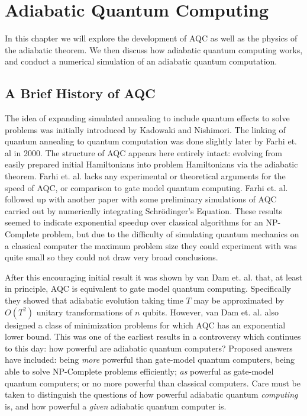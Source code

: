 \chapter{Adiabatic Quantum Computing}
\label{chap:aqc}

In this chapter we will explore the development of AQC as well as the physics of the adiabatic theorem.  We then discuss how adiabatic quantum computing works, and conduct a numerical simulation of an adiabatic quantum computation.

\section{A Brief History of AQC}
The idea of expanding simulated annealing to include quantum effects to solve problems was initially introduced by Kadowaki and Nishimori.\cite{transverse}  The linking of quantum annealing to quantum computation was done slightly later by Farhi et. al in 2000.\cite{farhi}  The structure of AQC appears here entirely intact: evolving from easily prepared initial Hamiltonians into problem Hamiltonians via the adiabatic theorem.  Farhi et. al.\cite{farhi} lacks any experimental or theoretical arguments for the speed of AQC, or comparison to gate model quantum computing.  Farhi et. al. followed up with another paper\cite{farhi2} with some preliminary simulations of AQC carried out by numerically integrating Schr\"odinger's Equation.  These results seemed to indicate exponential speedup over classical algorithms for an NP-Complete problem, but due to the difficulty of simulating quantum mechanics on a classical computer the maximum problem size they could experiment with was quite small so they could not draw very broad conclusions.

After this encouraging initial result it was shown by van Dam et. al.\cite{vandam} that, at least in principle, AQC is equivalent to gate model quantum computing.  Specifically they showed that adiabatic evolution taking time $T$ may be approximated by $O(T^2)$ unitary transformations of $n$ qubits.  However, van Dam et. al. also designed a class of minimization problems for which AQC has an exponential lower bound.  This was one of the earliest results in a controversy which continues to this day: how powerful are adiabatic quantum computers?  Proposed answers have included: being \emph{more} powerful than gate-model quantum computers, being able to solve NP-Complete problems efficiently;\cite{geordie}\cite{google} \emph{as} powerful as gate-model quantum computers;\cite{vandam} or no more powerful than classical computers.\cite{speedup}  Care must be taken to distinguish the questions of how powerful adiabatic quantum \emph{computing} is, and how powerful a \emph{given} adiabatic quantum computer is.

